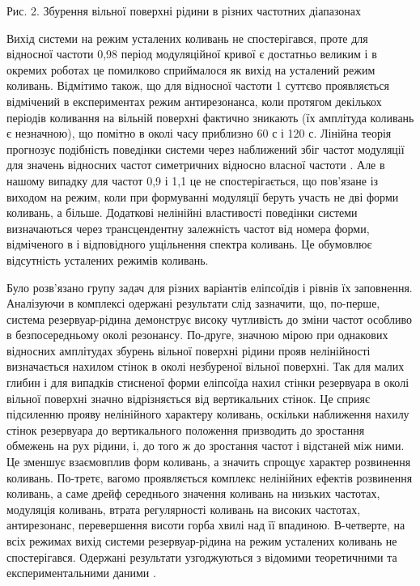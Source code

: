 \documentclass[11pt, reqno]{amsart}
\begin{document}
\vspace{-0,4cm}
\begin{center}
{Рис. 2. Збурення вільної поверхні рідини в різних частотних діапазонах}
\end{center}

\vspace{+0,2cm}

Вихід системи на режим усталених коливань не спостерігався, проте для відносної частоти 0,98 період модуляційної кривої є достатньо великим і в окремих роботах це помилково сприймалося як вихід на усталений режим коливань. Відмітимо також, що для відносної частоти 1 суттєво проявляється відмічений в експериментах режим антирезонанса, коли протягом декількох періодів коливання на вільній поверхні фактично зникають (їх амплітуда коливань є незначною), що помітно в околі часу приблизно 60 с і 120 с. Лінійна теорія прогнозує подібність поведінки системи через наближений збіг частот модуляції для значень відносних частот симетричних відносно власної частоти \cite{Sha}. Але в нашому випадку для частот 0,9 і 1,1 це не спостерігається, що пов'язане із виходом на режим, коли при формуванні модуляції беруть участь не дві форми коливань, а більше. Додаткові нелінійні властивості поведінки системи визначаються через трансцендентну залежність частот від номера форми, відміченого в \cite{Ono} і відповідного  ущільнення спектра коливань. Це обумовлює відсутність усталених режимів коливань.

Було розв'язано групу задач для різних варіантів еліпсоїдів і рівнів їх заповнення. Аналізуючи в комплексі одержані результати слід зазначити, що, по-перше, система резервуар-рідина демонструє високу чутливість до зміни частот особливо в безпосередньому околі резонансу. По-друге, значною мірою при однакових відносних амплітудах збурень вільної поверхні рідини прояв нелінійності визначається нахилом стінок в околі незбуреної вільної поверхні. Так для малих глибин і для випадків стисненої форми еліпсоїда нахил стінки резервуара в околі вільної поверхні значно відрізняється від вертикальних стінок. Це сприяє підсиленню прояву нелінійного характеру коливань, оскільки наближення нахилу стінок резервуара до вертикального положення призводить до зростання обмежень на рух рідини, і, до того ж до зростання частот і відстаней між ними. Це зменшує взаємовплив форм коливань, а значить спрощує характер розвинення коливань. По-третє, вагомо проявляється комплекс нелінійних ефектів розвинення коливань, а саме дрейф середнього значення коливань на низьких частотах, модуляція коливань, втрата регулярності коливань на високих частотах, антирезонанс, перевершення висоти горба хвилі над її впадиною. В-четверте, на всіх режимах вихід системи резервуар-рідина на режим усталених коливань не спостерігався. Одержані результати узгоджуються з відомими теоретичними та експериментальними даними \cite{Pal}.
\end{document}
